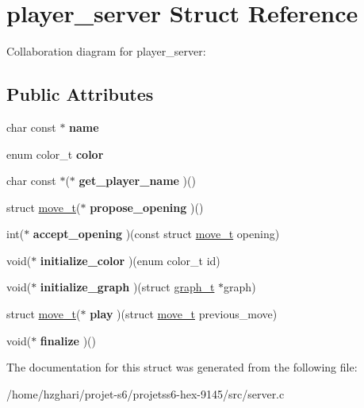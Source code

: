 \hypertarget{structplayer__server}{}\section{player\+\_\+server Struct Reference}
\label{structplayer__server}


Collaboration diagram for player\+\_\+server\+:
\subsection*{Public Attributes}
\begin{DoxyCompactItemize}
\item 
\mbox{\label{structplayer__server_a1eb924a7717a30b4b3017c39bfe56c87}} 
char const  $\ast$ {\bfseries name}
\item 
\mbox{\label{structplayer__server_a405cb184c2e221f3c7069a250ac4a36f}} 
enum color\+\_\+t {\bfseries color}
\item 
\mbox{\label{structplayer__server_a80e412ca444691566823e5f18e148416}} 
char const  $\ast$($\ast$ {\bfseries get\+\_\+player\+\_\+name} )()
\item 
\mbox{\label{structplayer__server_a4351b03fffc6a9f484da999560ebed0a}} 
struct \hyperlink{structmove__t}{move\+\_\+t}($\ast$ {\bfseries propose\+\_\+opening} )()
\item 
\mbox{\label{structplayer__server_ab527f0923fac0771a2015fc42c851b03}} 
int($\ast$ {\bfseries accept\+\_\+opening} )(const struct \hyperlink{structmove__t}{move\+\_\+t} opening)
\item 
\mbox{\label{structplayer__server_a79ea3850f8fd5991421479ef766c3396}} 
void($\ast$ {\bfseries initialize\+\_\+color} )(enum color\+\_\+t id)
\item 
\mbox{\label{structplayer__server_af1a62da2f87a96b6a861d943a702dd20}} 
void($\ast$ {\bfseries initialize\+\_\+graph} )(struct \hyperlink{structgraph__t}{graph\+\_\+t} $\ast$graph)
\item 
\mbox{\label{structplayer__server_aa733830a94c7027c8b88e263b4b9d9c0}} 
struct \hyperlink{structmove__t}{move\+\_\+t}($\ast$ {\bfseries play} )(struct \hyperlink{structmove__t}{move\+\_\+t} previous\+\_\+move)
\item 
\mbox{\label{structplayer__server_abab3a11e792adcad098e3b2ad56ab2d5}} 
void($\ast$ {\bfseries finalize} )()
\end{DoxyCompactItemize}


The documentation for this struct was generated from the following file\+:\begin{DoxyCompactItemize}
\item 
/home/hzghari/projet-\/s6/projetss6-\/hex-\/9145/src/server.\+c\end{DoxyCompactItemize}
